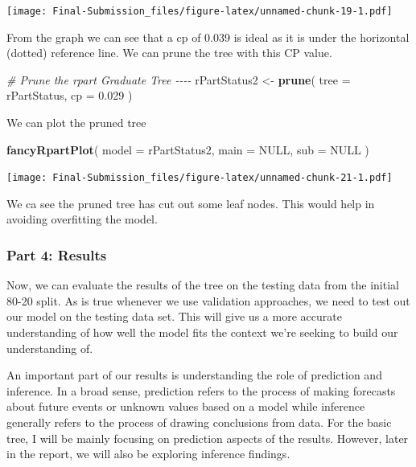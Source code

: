 \documentclass[
]{article}
\newenvironment{Shaded}{\begin{snugshade}}{\end{snugshade}}
\newcommand{\AttributeTok}[1]{\textcolor[rgb]{0.13,0.29,0.53}{#1}}
\newcommand{\CommentTok}[1]{\textcolor[rgb]{0.56,0.35,0.01}{\textit{#1}}}
\newcommand{\ConstantTok}[1]{\textcolor[rgb]{0.56,0.35,0.01}{#1}}
\newcommand{\FloatTok}[1]{\textcolor[rgb]{0.00,0.00,0.81}{#1}}
\newcommand{\FunctionTok}[1]{\textcolor[rgb]{0.13,0.29,0.53}{\textbf{#1}}}
\newcommand{\NormalTok}[1]{#1}
\newcommand{\OtherTok}[1]{\textcolor[rgb]{0.56,0.35,0.01}{#1}}
\begin{document}
\texttt{[image: Final-Submission\_files/figure-latex/unnamed-chunk-19-1.pdf]}

From the graph we can see that a cp of 0.039 is ideal as it is under the
horizontal (dotted) reference line. We can prune the tree with this CP
value.

\begin{Shaded}
\begin{Highlighting}[]
\CommentTok{\# Prune the rpart Graduate Tree {-}{-}{-}{-}}
\NormalTok{rPartStatus2 }\OtherTok{\textless{}{-}} \FunctionTok{prune}\NormalTok{(}
  \AttributeTok{tree =}\NormalTok{ rPartStatus,}
  \AttributeTok{cp =} \FloatTok{0.029}
\NormalTok{)}
\end{Highlighting}
\end{Shaded}

We can plot the pruned tree

\begin{Shaded}
\begin{Highlighting}[]
\FunctionTok{fancyRpartPlot}\NormalTok{(}
  \AttributeTok{model =}\NormalTok{ rPartStatus2,}
  \AttributeTok{main =} \ConstantTok{NULL}\NormalTok{,}
  \AttributeTok{sub =} \ConstantTok{NULL}
\NormalTok{)}
\end{Highlighting}
\end{Shaded}

\texttt{[image: Final-Submission\_files/figure-latex/unnamed-chunk-21-1.pdf]}

We ca see the pruned tree has cut out some leaf nodes. This would help
in avoiding overfitting the model.

\hypertarget{part-4-results}{%
\subsubsection{Part 4: Results}\label{part-4-results}}

Now, we can evaluate the results of the tree on the testing data from
the initial 80-20 split. As is true whenever we use validation
approaches, we need to test out our model on the testing data set. This
will give us a more accurate understanding of how well the model fits
the context we're seeking to build our understanding of.

An important part of our results is understanding the role of prediction
and inference. In a broad sense, prediction refers to the process of
making forecasts about future events or unknown values based on a model
while inference generally refers to the process of drawing conclusions
from data. For the basic tree, I will be mainly focusing on prediction
aspects of the results. However, later in the report, we will also be
exploring inference findings.
\end{document}
